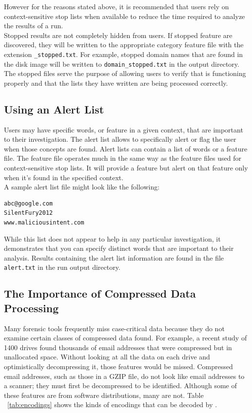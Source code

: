 \documentclass[11pt]{article} %
\begin{document}
However for the reasons stated above, it is recommended that users rely on context-sensitive stop lists when available to reduce the time required to analyze the results of a \bulk run.\\

Stopped results are not completely hidden from users. If stopped feature are discovered, they will be written to the appropriate category feature file with the extension \texttt{\_stopped.txt}. For example, stopped domain names that are found in the disk image will be written to \texttt{domain\_stopped.txt} in the output directory. The stopped files serve the purpose of allowing users to verify that \bulk is functioning properly and that the lists they have written are being processed correctly.

\subsection{Using an Alert List}
Users may have specific words, or feature in a given context, that are important to their investigation. The alert list allows \bulk to specifically alert or flag the user when those concepts are found. Alert lists can contain a list of words or a feature file. The feature file operates much in the same way as the feature files used for context-sensitive stop lists. It will provide a feature but alert on that feature only when it's found in the specified context.\\

A sample alert list file might look like the following:
\begin{verbatim}
abc@google.com
SilentFury2012
www.maliciousintent.com
\end{verbatim}

While this list does not appear to help in any particular investigation, it demonstrates that you can specify distinct words that are important to their analysis. Results containing the alert list information are found in the file \texttt{alert.txt} in the run output directory.

\subsection{The Importance of Compressed Data Processing}
\label{compressedProcessing}

Many forensic tools frequently miss case-critical data because they do not examine certain classes of compressed data found. For example, a recent study of 1400 drives found thousands of email addresses that were compressed but in unallocated space\cite{encodedEvidence}. Without looking at all the data on each drive and optimistically decompressing it, those features would be missed. Compressed email addresses, such as those in a GZIP file, do not look like email addresses to a scanner; they must first be decompressed to be identified. Although some of these features are from software distributions, many are not. Table ~\ref{tab:encodings} shows the kinds of encodings that can be decoded by \bulk \cite{encodedEvidence}.
\end{document}
